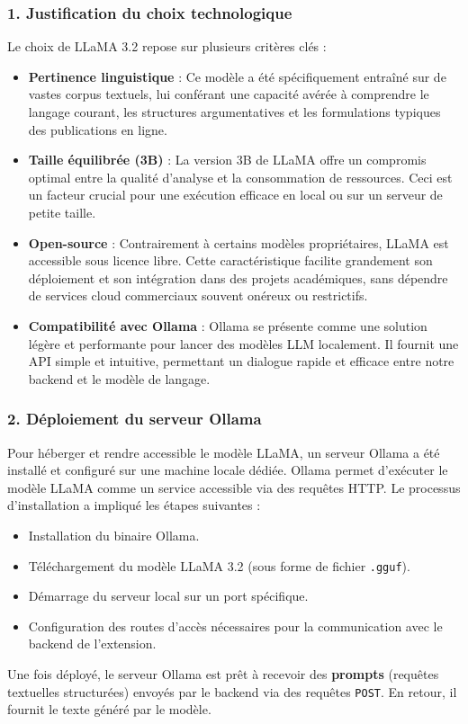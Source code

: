 \begin{description}
\subsubsection*{1. Justification du choix technologique}
Le choix de LLaMA 3.2 repose sur plusieurs critères clés :
\begin{itemize}
    \item \textbf{Pertinence linguistique} : Ce modèle a été spécifiquement entraîné sur de vastes corpus textuels, lui conférant une capacité avérée à comprendre le langage courant, les structures argumentatives et les formulations typiques des publications en ligne.
    \item \textbf{Taille équilibrée (3B)} : La version 3B de LLaMA offre un compromis optimal entre la qualité d'analyse et la consommation de ressources. Ceci est un facteur crucial pour une exécution efficace en local ou sur un serveur de petite taille.
    \item \textbf{Open-source} : Contrairement à certains modèles propriétaires, LLaMA est accessible sous licence libre. Cette caractéristique facilite grandement son déploiement et son intégration dans des projets académiques, sans dépendre de services cloud commerciaux souvent onéreux ou restrictifs.
    \item \textbf{Compatibilité avec Ollama} : Ollama se présente comme une solution légère et performante pour lancer des modèles LLM localement. Il fournit une API simple et intuitive, permettant un dialogue rapide et efficace entre notre backend et le modèle de langage.
\end{itemize}

\subsubsection*{2. Déploiement du serveur Ollama}
Pour héberger et rendre accessible le modèle LLaMA, un serveur Ollama a été installé et configuré sur une machine locale dédiée. Ollama permet d'exécuter le modèle LLaMA comme un service accessible via des requêtes HTTP. Le processus d'installation a impliqué les étapes suivantes :
\begin{itemize}
    \item Installation du binaire Ollama.
    \item Téléchargement du modèle LLaMA 3.2 (sous forme de fichier \texttt{.gguf}).
    \item Démarrage du serveur local sur un port spécifique.
    \item Configuration des routes d'accès nécessaires pour la communication avec le backend de l'extension.
\end{itemize}
Une fois déployé, le serveur Ollama est prêt à recevoir des \textbf{prompts} (requêtes textuelles structurées) envoyés par le backend via des requêtes \texttt{POST}. En retour, il fournit le texte généré par le modèle.



\end{description}
